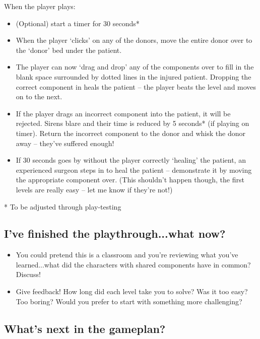 \documentclass{article}
\begin{document}
\newpage

When the player plays:
\begin{itemize}
  \item (Optional) start a timer for 30 seconds*
  \item When the player `clicks' on any of the donors, move the entire donor over to the `donor' bed under the patient.
  \item The player can now `drag and drop' any of the components over to fill in the blank space surrounded by dotted lines in the injured patient. Dropping the correct component in heals the patient -- the player beats the level and moves on to the next.
  \item If the player drags an incorrect component into the patient, it will be rejected. Sirens blare and their time is reduced by 5 seconds* (if playing on timer). Return the incorrect component to the donor and whisk the donor away -- they've suffered enough!
  \item If 30 seconds goes by without the player correctly `healing' the patient, an experienced surgeon steps in to heal the patient -- demonstrate it by moving the appropriate component over. (This shouldn't happen though, the first levels are really easy -- let me know if they're not!)
\end{itemize}

* To be adjusted through play-testing

\newpage

\setcounter{page}{9}

\subsection*{I've finished the playthrough...what now?}

\begin{itemize}
  \item You could pretend this is a classroom and you're reviewing what you've learned...what did the characters with shared components have in common? Discuss!
  \item Give feedback! How long did each level take you to solve? Was it too easy? Too boring? Would you prefer to start with something more challenging?  
\end{itemize}

\subsection*{What's next in the gameplan?}
\end{document}
